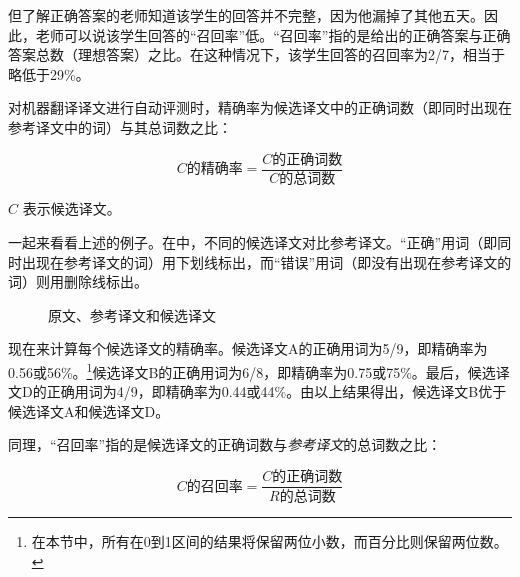 \documentclass[output=paper]{langscibook}
\begin{document}
但了解正确答案的老师知道该学生的回答并不完整，因为他漏掉了其他五天。因此，老师可以说该学生回答的“召回率”低。“召回率”指的是给出的正确答案与正确答案总数（理想答案）之比。在这种情况下，该学生回答的召回率为2/7，相当于略低于29\%。

对机器翻译译文进行自动评测时，精确率为候选译文中的正确词数（即同时出现在参考译文中的词）与其总词数之比：\pagebreak

\begin{equation}
C \text{的精确率}=\frac{C\text{的正确词数}}{C\text{的总词数}}
\end{equation}

 $C$ 表示候选译文。

一起来看看上述的例子。在中，不同的候选译文对比参考译文。“正确”用词（即同时出现在参考译文的词）用下划线标出，而“错误”用词（即没有出现在参考译文的词）则用删除线标出。

\begin{figure}
\small
{}
\caption{原文、参考译文和候选译文}
\label{fig:rossi:6}
\end{figure}

现在来计算每个候选译文的精确率。候选译文A的正确用词为5/9，即精确率为0.56或56\%。\footnote{在本节中，所有在0到1区间的结果将保留两位小数，而百分比则保留两位数。}候选译文B的正确用词为6/8，即精确率为0.75或75\%。最后，候选译文D的正确用词为4/9，即精确率为0.44或44\%。由以上结果得出，候选译文B优于候选译文A和候选译文D。


同理，“召回率”指的是候选译文的正确词数与\textit{参考译文}的总词数之比：

\begin{equation}
C \text{的召回率}=\frac{C \text{的正确词数} }{R \text{的总词数} }
\end{equation}
\end{document}
